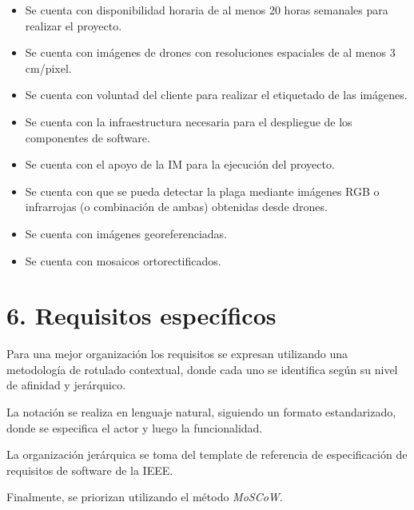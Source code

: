\documentclass[
11pt, %
]{charter}
\begin{document}
\begin{itemize}

  \item Se cuenta con disponibilidad horaria de al menos 20 horas semanales para realizar el proyecto.
  \item Se cuenta con imágenes de drones con resoluciones espaciales de al menos 3 cm/pixel.
  \item Se cuenta con voluntad del cliente para realizar el etiquetado de las imágenes.
  \item Se cuenta con la infraestructura necesaria para el despliegue de los componentes de software.
  \item Se cuenta con el apoyo de la IM para la ejecución del proyecto.
  \item Se cuenta con que se pueda detectar la plaga mediante imágenes RGB o infrarrojas (o combinación de ambas) obtenidas desde drones.
  \item Se cuenta con imágenes georeferenciadas.
  \item Se cuenta con mosaicos ortorectificados.

\end{itemize}

\section{6. Requisitos específicos}
\label{sec:requisitos}

Para una mejor organización los requisitos se expresan utilizando una metodología de rotulado contextual, donde cada uno se identifica según su nivel de afinidad y jerárquico.

La notación se realiza en lenguaje natural, siguiendo un formato estandarizado, donde se especifica el actor y luego la funcionalidad.

La organización jerárquica se toma del template de referencia de especificación de requisitos de software de la IEEE\cite{SRSTemplateIEE}.

Finalmente, se priorizan utilizando el método \textit{MoSCoW}\cite{moscowMethod}.
\end{document}
